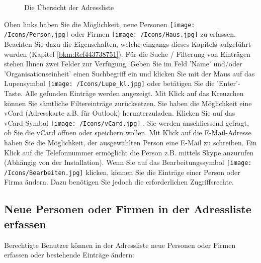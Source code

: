 \begin{figure}[H]
\caption{Die Übersicht der Adressliste}
\end{figure}

Oben links haben Sie die Möglichkeit, neue Personen \texttt{[image: /Icons/Person.jpg]} oder Firmen \texttt{[image: /Icons/Haus.jpg]} zu erfassen. Beachten Sie dazu die Eigenschaften, welche eingangs dieses Kapitels aufgeführt wurden (Kapitel \ref{bkm:Ref443738751}). \newline
Für die Suche / Filterung von Einträgen stehen Ihnen zwei Felder zur Verfügung. Geben Sie im Feld 'Name' und/oder 'Organisationseinheit'  einen Suchbegriff ein und klicken Sie mit der Maus auf das Lupensymbol \texttt{[image: /Icons/Lupe\_kl.jpg]}  oder betätigen Sie die 'Enter'-Taste. Alle gefunden Einträge werden angezeigt. Mit Klick auf das Kreuzchen  können Sie sämtliche Filtereinträge zurücksetzen. \newline
Sie haben die Möglichkeit eine vCard (Adresskarte z.B. für Outlook) herunterzuladen. Klicken Sie auf das vCard-Symbol \texttt{[image: /Icons/vCard.jpg]} . Sie werden anschliessend gefragt, ob Sie die vCard öffnen
oder speichern wollen.\newline
Mit Klick auf die E-Mail-Adresse  haben Sie die Möglichkeit, der ausgewählten Person eine E-Mail zu schreiben. Ein Klick auf die Telefonnummer  ermöglicht die Person z.B. mittels Skype anzurufen (Abhängig von der Installation).\newline
Wenn Sie auf das Bearbeitungssymbol \texttt{[image: /Icons/Bearbeiten.jpg]}  klicken, können Sie die Einträge einer Person oder Firma ändern. Dazu benötigen Sie jedoch die erforderlichen Zugriffsrechte.

\subsection{Neue Personen oder Firmen in der Adressliste erfassen}
Berechtigte Benutzer können in der Adressliste neue Personen oder Firmen erfassen oder bestehende Einträge ändern:

